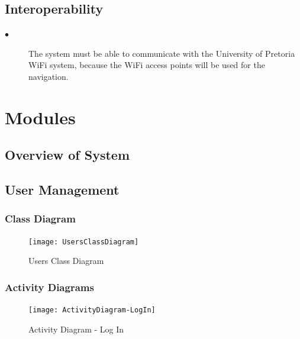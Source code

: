 \documentclass{article}
\begin{document}
    \subsection{Interoperability}
    
        \begin{description}
        
        \item[$\bullet$]The system must be able to communicate with the University of Pretoria WiFi system, because the WiFi  access points will be used for the navigation.
        
        \end{description}
\newpage
\section{Modules}
	
	\subsection{Overview of System}
	
	\newpage
    \subsection{User Management}
        \subsubsection{Class Diagram}
        		\begin{figure}[H]
  			\caption{Users Class Diagram}
  			\centering
    			\texttt{[image: UsersClassDiagram]}
		\end{figure}
		\newpage
        \subsubsection{Activity Diagrams}
        	\begin{figure}[H]
  			\caption{Activity Diagram - Log In}
  			\centering
    			\texttt{[image: ActivityDiagram-LogIn]}
		\end{figure}
		
\end{document}
